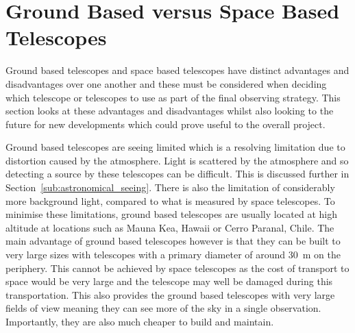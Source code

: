 
\section{Ground Based versus Space Based Telescopes} %
\label{sec:ground_based_versus_space_based_telescopes}
	Ground based telescopes and space based telescopes have distinct advantages and disadvantages over one another and these must be considered when deciding which telescope or telescopes to use as part of the final observing strategy. This section looks at these advantages and disadvantages whilst also looking to the future for new developments which could prove useful to the overall project.

	Ground based telescopes are seeing limited which is a resolving limitation due to distortion caused by the atmosphere. Light is scattered by the atmosphere and so detecting a source by these telescopes can be difficult. This is discussed further in Section~\ref{sub:astronomical_seeing}. There is also the limitation of considerably more background light, compared to what is measured by space telescopes. To minimise these limitations, ground based telescopes are usually located at high altitude at locations such as Mauna Kea, Hawaii or Cerro Paranal, Chile. The main advantage of ground based telescopes however is that they can be built to very large sizes with telescopes with a primary diameter of around \SI{30}{\metre} on the periphery. This cannot be achieved by space telescopes as the cost of transport to space would be very large and the telescope may well be damaged during this transportation. This also provides the ground based telescopes with very large fields of view meaning they can see more of the sky in a single observation. Importantly, they are also much cheaper to build and maintain.


